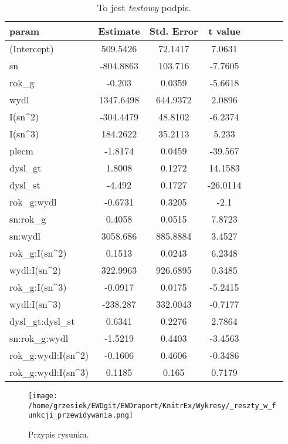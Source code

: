  
\begin{table}[tb] 
\begin{tabularx}{\textwidth}{@{\hspace{1.7 mm}}Xccccccc@{\hspace{1.7 mm}}} 
\midrule 
   param & Estimate & Std. Error & t value \\ \bottomrule 
   (Intercept) & 509.5426 & 72.1417 & 7.0631 \\ 
   sn & -804.8863 & 103.716 & -7.7605 \\ 
   rok\_g & -0.203 & 0.0359 & -5.6618 \\ 
   wydl & 1347.6498 & 644.9372 & 2.0896 \\ 
   I(sn\^{ }2) & -304.4479 & 48.8102 & -6.2374 \\ 
   I(sn\^{ }3) & 184.2622 & 35.2113 & 5.233 \\ 
   plecm & -1.8174 & 0.0459 & -39.567 \\ 
   dysl\_gt & 1.8008 & 0.1272 & 14.1583 \\ 
   dysl\_st & -4.492 & 0.1727 & -26.0114 \\ 
   rok\_g:wydl & -0.6731 & 0.3205 & -2.1 \\ 
   sn:rok\_g & 0.4058 & 0.0515 & 7.8723 \\ 
   sn:wydl & 3058.686 & 885.8884 & 3.4527 \\ 
   rok\_g:I(sn\^{ }2) & 0.1513 & 0.0243 & 6.2348 \\ 
   wydl:I(sn\^{ }2) & 322.9963 & 926.6895 & 0.3485 \\ 
   rok\_g:I(sn\^{ }3) & -0.0917 & 0.0175 & -5.2415 \\ 
   wydl:I(sn\^{ }3) & -238.287 & 332.0043 & -0.7177 \\ 
   dysl\_gt:dysl\_st & 0.6341 & 0.2276 & 2.7864 \\ 
   sn:rok\_g:wydl & -1.5219 & 0.4403 & -3.4563 \\ 
   rok\_g:wydl:I(sn\^{ }2) & -0.1606 & 0.4606 & -0.3486 \\ 
   rok\_g:wydl:I(sn\^{ }3) & 0.1185 & 0.165 & 0.7179 \\ 
\end{tabularx} 
\caption*{ To jest \emph{testowy} podpis. } 
\end{table} 
 
\begin{figure} 
\texttt{[image: /home/grzesiek/EWDgit/EWDraport/KnitrEx/Wykresy/\_reszty\_w\_funkcji\_przewidywania.png]} 
\caption*{Przypis rysunku.} 
\end{figure} 
 
